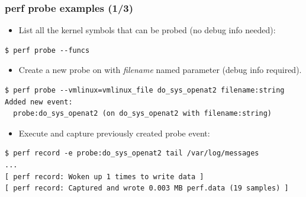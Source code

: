 \begin{frame}[fragile]
  \frametitle{perf probe examples (1/3)}
  \begin{itemize}
    \item List all the kernel symbols that can be probed (no debug info needed):
  \end{itemize}
  \begin{block}{}
    \begin{verbatim}
$ perf probe --funcs
    \end{verbatim}
  \end{block}
  \begin{itemize}
    \item Create a new probe on  with {\em filename}
          named parameter (debug info required).
  \end{itemize}
  \begin{block}{}
    \begin{verbatim}
$ perf probe --vmlinux=vmlinux_file do_sys_openat2 filename:string
Added new event:
  probe:do_sys_openat2 (on do_sys_openat2 with filename:string)
    \end{verbatim}
  \end{block}
  \begin{itemize}
    \item Execute  and capture previously created probe event:
  \end{itemize}
  \begin{block}{}
    \begin{verbatim}
$ perf record -e probe:do_sys_openat2 tail /var/log/messages
...
[ perf record: Woken up 1 times to write data ]
[ perf record: Captured and wrote 0.003 MB perf.data (19 samples) ]
    \end{verbatim}
  \end{block}
\end{frame}

